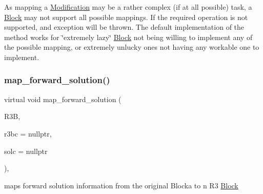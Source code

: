 As mapping a \mbox{\hyperlink{class_s_m_spp__di__unipi__it_1_1_modification}{Modification}} may be a rather complex (if at all possible) task, a \mbox{\hyperlink{class_s_m_spp__di__unipi__it_1_1_block}{Block}} may not support all possible mappings. If the required operation is not supported, and exception will be thrown. The default implementation of the method works for \char`\"{}extremely lazy\char`\"{} \mbox{\hyperlink{class_s_m_spp__di__unipi__it_1_1_block}{Block}} not being willing to implement any of the possible mapping, or extremely unlucky ones not having any workable one to implement. \mbox{\label{class_s_m_spp__di__unipi__it_1_1_block_a7759467d70613a10c1cdb5d3193b4434}} 
\subsubsection{\texorpdfstring{map\+\_\+forward\+\_\+solution()}{map\_forward\_solution()}}
{\footnotesize\ttfamily virtual void map\+\_\+forward\+\_\+solution (\begin{DoxyParamCaption}\item[{\mbox{\hyperlink{class_s_m_spp__di__unipi__it_1_1_block}{Block}} $\ast$}]{R3B,  }\item[{\mbox{\hyperlink{class_s_m_spp__di__unipi__it_1_1_configuration}{Configuration}} $\ast$}]{r3bc = {\ttfamily nullptr},  }\item[{\mbox{\hyperlink{class_s_m_spp__di__unipi__it_1_1_configuration}{Configuration}} $\ast$}]{solc = {\ttfamily nullptr} }\end{DoxyParamCaption})\hspace{0.3cm}{\ttfamily [inline]}, {\ttfamily [virtual]}}



maps forward solution information from the original Blocka to n R3 \mbox{\hyperlink{class_s_m_spp__di__unipi__it_1_1_block}{Block}} 

